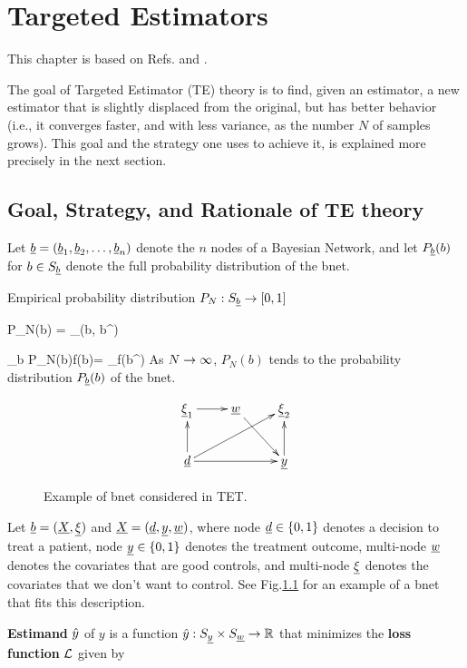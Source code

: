 \chapter{Targeted Estimators}
\label{ch-targeted-est}

This chapter is based on Refs.\cite{tlride} and  \cite{hoff}.

The goal of Targeted Estimator (TE) theory is
to find, given an estimator,
a new estimator that is slightly
displaced from the original,
but has better behavior (i.e.,
it converges faster, and with less
variance, as the number $N$
of samples grows). This goal and
the strategy one uses to achieve it, is
explained more precisely in the next section.




\section{Goal, Strategy, and Rationale of TE theory}


Let ${\underline{b}} = ({\underline{b}}_1, {\underline{b}}_2, \ldots, {\underline{b}}_{n})$ denote
the $n$ nodes of a Bayesian Network, and let $P_{\underline{b}}(b)$ for $b\in S_{\underline{b}}$
denote the full probability distribution of the bnet.

Empirical probability distribution $P_N:S_{\underline{b}} \rightarrow [0,1]$

\beq
P_N(b) = \sum_\s\delta(b, b^\s)
\eeq

\beq
\sum_b P_N(b)f(b)=
\sum_\s f(b^\s)
\eeq
As $N\rightarrow \infty$, $P_N(b)$ tends
to the probability distribution $P_{\underline{b}}(b)$
of the bnet.
\begin{figure}[h!]
$$
\xymatrix{
\ul{\xi}_1\ar[r]
&\rvw\ar[dr]
&\ul{\xi}_2
\\
\rvd\ar[rr]\ar[u]\ar[rru]
&
&\rvy\ar[u]
}
$$
\caption{Example of bnet considered in TET.}
\label{fig-targeted-bnet}
\end{figure}

Let ${\underline{b}}=({\underline{X}}, \underline{\xi})$ and
${\underline{X}}=({\underline{d}}, {\underline{y}},{\underline{w}})$,
where
node ${\underline{d}}\in\{0,1\}$ denotes a decision to treat a patient,
node ${\underline{y}}\in \{0,1\}$ denotes the treatment outcome,
multi-node ${\underline{w}}$ denotes the covariates
that are good controls, and multi-node $\underline{\xi}$ denotes
the covariates that we don't want to control.
See Fig.\ref{fig-targeted-bnet}
for an example of a bnet that fits this description.


{\bf Estimand} ${\hat{y}}$ of $y$
is a function ${\hat{y}}:S_{\underline{y}}\times S_{\underline{w}}\rightarrow { \mathbb{R}}$
that minimizes the {\bf loss function} ${\cal L}$
given by


